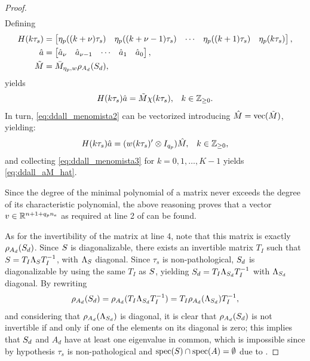 \begin{proof}
\begin{multline}
  \end{multline}
  Defining
  \begin{subequations}
    \begin{align}
      H(k\tau_s) &= \begin{bmatrix}\eta_p((k+\nu)\tau_s) & \eta_p((k+\nu-1)\tau_s) & \cdots & \eta_p((k+1)\tau_s) & \eta_p(k\tau_s)\end{bmatrix}, \\
      \hat{a}    &= \begin{bmatrix}\hat{a}_{\nu} & \hat{a}_{\nu-1} & \cdots & \hat{a}_1 & \hat{a}_0\end{bmatrix}, \\
      \tilde{M}  &= \bar{M}_{\eta_p,w}\rho_{A_d}(S_d),
    \end{align}
  \end{subequations}
  yields
  \begin{align}
    \label{eq:ddall_menomista2}
    H(k\tau_s)\hat{a} &= \tilde{M}\chi(k\tau_s), & k\in\mathbb{Z}_{\geq 0}.
  \end{align}
  In turn, \eqref{eq:ddall_menomista2} can be vectorized \cite[Sec. 2.5]{zhou_robust_1996} introducing $\hat{M}=\mathrm{vec}(\tilde{M})$, yielding:
  \begin{align}
    \label{eq:ddall_menomista3}
    H(k\tau_s)\hat{a} &= (w(k\tau_s)'\otimes I_{{q_p}})\hat{M}, & k\in\mathbb{Z}_{\geq 0},
  \end{align}
  and collecting \eqref{eq:ddall_menomista3} for $k=0,1,\ldots,K-1$ yields \eqref{eq:ddall_aM_hat}.

  Since the degree of the minimal polynomial of a matrix never exceeds the degree of its characteristic polynomial, the above reasoning proves that a vector $v\in\mathbb{R}^{n+1+{q_p} n_e}$ as required at line 2 of  can be found.

  As for the invertibility of the matrix at line 4, note that this matrix is exactly $\rho_{A_d}(S_d)$. Since $S$ is diagonalizable, there exists an invertible matrix $T_I$ such that $S=T_I\Lambda_S T_I^{-1}$, with $\Lambda_S$ diagonal. Since $\tau_s$ is non-pathological, $S_d$ is diagonalizable by using the same $T_I$ as $S$, yielding $S_d=T_I\Lambda_{S_d} T_I^{-1}$ with $\Lambda_{S_d}$ diagonal. By rewriting
  \begin{equation}
    \rho_{A_d}(S_d) = \rho_{A_d}(T_I\Lambda_{S_d}	T_I^{-1})=T_I\rho_{A_d}(\Lambda_{S_d})T_I^{-1},
  \end{equation}
  and considering that $\rho_{A_d}(\Lambda_{S_d})$ is diagonal, it is clear that $\rho_{A_d}(S_d)$ is not invertible if and only if one of the elements on its diagonal is zero; this implies that $S_d$ and $A_d$ have at least one eigenvalue in common, which is impossible since by hypothesis $\tau_s$ is non-pathological and $\operatorname{spec}(S)\cap\operatorname{spec}(A)=\emptyset$ due to .


\end{proof}
